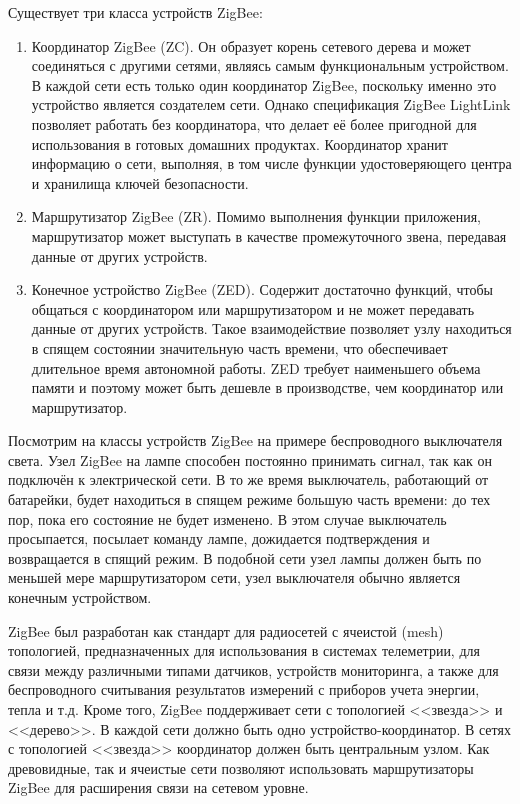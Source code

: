 	Существует три класса устройств ZigBee:
	
	\begin{enumerate}
		\item Координатор ZigBee (ZC). Он образует корень сетевого дерева и может соединяться с другими 
		сетями, являясь самым функциональным устройством. В каждой сети есть только один координатор 
		ZigBee, поскольку именно это устройство является создателем сети. Однако спецификация ZigBee 
		LightLink позволяет работать без координатора, что делает её более пригодной для использования 
		в готовых домашних продуктах. Координатор хранит информацию о сети, выполняя, в том числе функции 
		удостоверяющего центра и хранилища ключей безопасности.
		\item Маршрутизатор ZigBee (ZR). Помимо выполнения функции приложения, маршрутизатор может 
		выступать в качестве промежуточного звена, передавая данные от других устройств.
		\item Конечное устройство ZigBee (ZED). Содержит достаточно функций, чтобы общаться с координатором 
		или маршрутизатором и не может передавать данные от других устройств. Такое взаимодействие 
		позволяет узлу находиться в спящем состоянии значительную часть времени, что обеспечивает 
		длительное время автономной работы. ZED требует наименьшего объема памяти и поэтому может 
		быть дешевле в производстве, чем координатор или маршрутизатор.
	\end{enumerate}

	Посмотрим на классы устройств ZigBee на примере беспроводного выключателя света. Узел ZigBee на лампе 
	способен постоянно принимать сигнал, так как он подключён к электрической сети. В то же время выключатель, 
	работающий от батарейки, будет находиться в спящем режиме большую часть времени: до тех пор, пока 
	его состояние не будет изменено. В этом случае выключатель просыпается, посылает команду лампе, 
	дожидается подтверждения и возвращается в спящий режим. В подобной сети узел лампы должен быть 
	по меньшей мере маршрутизатором сети, узел выключателя обычно является конечным устройством.
	
	ZigBee был разработан как стандарт для радиосетей с ячеистой (mesh) топологией, предназначенных
	для использования в системах телеметрии, для связи между различными типами датчиков, устройств
	мониторинга, а также для беспроводного считывания результатов измерений с приборов учета энергии,
	тепла и т.д. Кроме того, ZigBee поддерживает сети с топологией <<звезда>> и <<дерево>>. В каждой 
	сети должно быть одно устройство-координатор. В сетях с топологией <<звезда>> координатор должен 
	быть центральным узлом. Как древовидные, так и ячеистые сети позволяют использовать маршрутизаторы 
	ZigBee для расширения связи на сетевом уровне.
	
